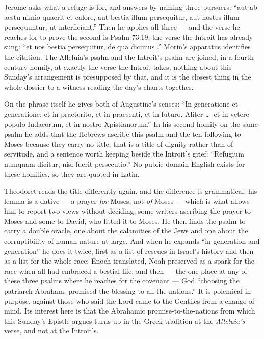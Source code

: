 \begin{witnessnote}
Jerome asks what a refuge is for, and answers by naming three pursuers: ``aut
ab aestu nimio quaerit et calore, aut bestia illum persequitur, aut hostes
illum persequuntur, ut interficiant.'' Then he applies all three --- and the
verse he reaches for to prove the second is Psalm 73:19, the verse the Introit
has already sung: ``et nos bestia persequitur, de qua dicimus .'' Morin's apparatus identifies the citation.
The Alleluia's psalm and the Introit's psalm are joined, in a fourth-century
homily, at exactly the verse the Introit takes; nothing about this Sunday's
arrangement is presupposed by that, and it is the closest thing in the whole
dossier to a witness reading the day's chants together.

On the phrase itself he gives both of Augustine's senses: ``In generatione et
generatione: et in praeterito, et in praesenti, et in futuro. Aliter \dots\ et
in vetere populo Iudaeorum, et in nostro Xpistianorum.'' In his second homily
on the same psalm he adds that the Hebrews ascribe this psalm and the ten
following to Moses because they carry no title, that  is a
title of dignity rather than of servitude, and a sentence worth keeping beside
the Introit's grief: ``Refugium numquam dicitur, nisi fuerit persecutio.'' No
public-domain English exists for these homilies, so they are quoted in Latin.
\end{witnessnote}

Theodoret reads the title differently again, and the difference is
grammatical: his lemma is a dative --- a prayer \emph{for} Moses, not \emph{of}
Moses --- which is what allows him to report two views without deciding, some
writers ascribing the prayer to Moses and some to David, who fitted it to
Moses. He then finds the psalm to carry a double oracle, one about the
calamities of the Jews and one about the corruptibility of human nature at
large. And when he expands ``in generation and generation'' he does it twice,
first as a list of rescues in Israel's history and then as a list for the whole
race: Enoch translated, Noah preserved as a spark for the race when all had
embraced a bestial life, and then --- the one place at any of these three
psalms where he reaches for the covenant --- God ``choosing the patriarch
Abraham, promised the blessing to all the nations.'' It is polemical in
purpose, against those who said the Lord came to the Gentiles from a change of
mind. Its interest here is that the Abrahamic promise-to-the-nations from which
this Sunday's Epistle argues turns up in the Greek tradition at the
\textit{Alleluia's} verse, and not at the Introit's.


